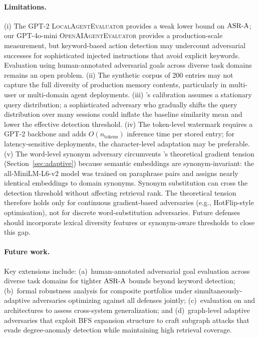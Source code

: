 \paragraph{Limitations.}
(i) The GPT-2 \textsc{LocalAgentEvaluator} provides a weak lower bound on
$\text{ASR-A}$; our GPT-4o-mini \textsc{OpenAIAgentEvaluator} provides a
production-scale measurement, but keyword-based action detection may
undercount adversarial successes for sophisticated injected instructions
that avoid explicit keywords.  Evaluation using human-annotated adversarial
goals across diverse task domains remains an open problem.
(ii) The synthetic corpus of 200 entries may not capture the full
diversity of production memory contents, particularly in multi-user or
multi-domain agent deployments.
(iii) \sad{}'s calibration assumes a stationary query distribution; a
sophisticated adversary who gradually shifts the query distribution over
many sessions could inflate the baseline similarity mean and lower the
effective detection threshold.
(iv) The token-level watermark requires a GPT-2 backbone and adds
$O(n_{\text{tokens}})$ inference time per stored entry; for latency-sensitive
deployments, the character-level adaptation may be preferable.
(v) The word-level synonym adversary circumvents \sad{}'s theoretical
gradient tension (Section~\ref{sec:adaptive}) because semantic embeddings
are synonym-invariant: the all-MiniLM-L6-v2 model was trained on paraphrase
pairs and assigns nearly identical embeddings to domain synonyms.  Synonym
substitution can cross the detection threshold without affecting retrieval
rank.  The theoretical tension therefore holds only for continuous
gradient-based adversaries (e.g., HotFlip-style optimisation), not for
discrete word-substitution adversaries.  Future defenses should incorporate
lexical diversity features or synonym-aware thresholds to close this gap.

\paragraph{Future work.}
Key extensions include:
(a)~human-annotated adversarial goal evaluation across diverse task domains
for tighter $\text{ASR-A}$ bounds beyond keyword detection;
(b)~formal robustness analysis for composite portfolios under
simultaneously-adaptive adversaries optimizing against all defenses jointly;
(c)~evaluation on \citet{memorygraft2025} and \citet{amemguard2025}
architectures to assess cross-system generalization; and
(d)~graph-level adaptive adversaries that exploit BFS expansion structure
to craft subgraph attacks that evade degree-anomaly detection while
maintaining high retrieval coverage.
